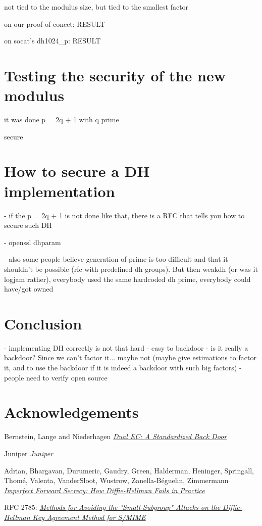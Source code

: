 \documentclass[a4paper,11pt]{article}
\begin{document}
not tied to the modulus size, but tied to the smallest factor

on our proof of concet: RESULT

on socat's dh1024_p: RESULT

\section{Testing the security of the new modulus}

it was done p = 2q + 1 with q prime

secure

\section{How to secure a DH implementation}

- if the p = 2q + 1 is not done like that, there is a RFC that tells you how to secure such DH

- openssl dhparam

- also some people believe generation of prime is too difficult and that it shouldn't be possible (rfc with predefined dh groups). But then weakdh (or was it logjam rather), everybody used the same hardcoded dh prime, everybody could have/got owned

\section{Conclusion}

- implementing DH correctly is not that hard
- easy to backdoor
- is it really a backdoor? Since we can't factor it... maybe not (maybe give estimations to factor it, and to use the backdoor if it is indeed a backdoor with such big factors)
- people need to verify open source

\newpage

\section*{Acknowledgements}


\newpage

\begin{thebibliography}{1}

 Bernstein, Lange and Niederhagen {\em \href{https://eprint.iacr.org/2015/767.pdf}{Dual EC: A Standardized Back Door}}

 Juniper {\em Juniper}

 Adrian, Bhargavan, Durumeric, Gaudry, Green, Halderman, Heninger, Springall, Thomé, Valenta,  VanderSloot, Wustrow, Zanella-Béguelin, Zimmermann \em{\href{https://weakdh.org/imperfect-forward-secrecy-ccs15.pdf}{Imperfect Forward Secrecy: How Diffie-Hellman Fails in Practice}}

 RFC 2785: \em{\href{https://tools.ietf.org/html/rfc2785}{Methods for Avoiding the "Small-Subgroup" Attacks on the Diffie-Hellman Key Agreement Method for S/MIME}}

\end{thebibliography}
\end{document}
